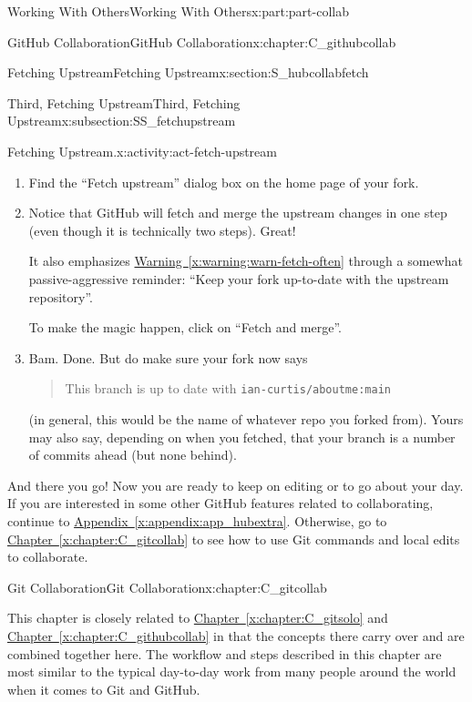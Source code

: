 \documentclass[oneside,10pt,]{book}
\newcommand{\xreffont}{\relax}
\newcommand{\mono}[1]{\texttt{#1}}
\begin{document}
\begin{partptx}{Working With Others}{}{Working With Others}{}{}{x:part:part-collab}
\begin{chapterptx}{GitHub Collaboration}{}{GitHub Collaboration}{}{}{x:chapter:C_githubcollab}
\begin{sectionptx}{Fetching Upstream}{}{Fetching Upstream}{}{}{x:section:S_hubcollabfetch}
\begin{subsectionptx}{Third, Fetching Upstream}{}{Third, Fetching Upstream}{}{}{x:subsection:SS_fetchupstream}
\begin{activity}{Fetching Upstream.}{x:activity:act-fetch-upstream}
\begin{enumerate}[font=\bfseries,label=(\alph*),ref=\alph*]
\item{}Find the ``Fetch upstream'' dialog box on the home page of your fork.%
\item{}Notice that GitHub will fetch and merge the upstream changes in one step (even though it is technically two steps). Great!%
\par
It also emphasizes \hyperref[x:warning:warn-fetch-often]{Warning~{\xreffont\ref{x:warning:warn-fetch-often}}} through a somewhat passive-aggressive reminder: ``Keep your fork up-to-date with the upstream repository''.%
\par
To make the magic happen, click on ``Fetch and merge''.%
\item{}Bam. Done. But do make sure your fork now says \begin{quote}%
This branch is up to date with \mono{ian-curtis/aboutme:main}\end{quote}
 (in general, this would be the name of whatever repo you forked from). Yours may also say, depending on when you fetched, that your branch is a number of commits ahead (but none behind).%
\end{enumerate}
\end{activity}%
\end{subsectionptx}
\begin{conclusion}{}%
And there you go! Now you are ready to keep on editing or to go about your day. If you are interested in some other GitHub features related to collaborating, continue to \hyperref[x:appendix:app_hubextra]{Appendix~{\xreffont\ref{x:appendix:app_hubextra}}}. Otherwise, go to \hyperref[x:chapter:C_gitcollab]{Chapter~{\xreffont\ref{x:chapter:C_gitcollab}}} to see how to use Git commands and local edits to collaborate.%
\end{conclusion}%
\end{sectionptx}
\end{chapterptx}
%
\typeout{************************************************}
\typeout{************************************************}
%
\begin{chapterptx}{Git Collaboration}{}{Git Collaboration}{}{}{x:chapter:C_gitcollab}
\begin{introduction}{}%
This chapter is closely related to \hyperref[x:chapter:C_gitsolo]{Chapter~{\xreffont\ref{x:chapter:C_gitsolo}}} and \hyperref[x:chapter:C_githubcollab]{Chapter~{\xreffont\ref{x:chapter:C_githubcollab}}} in that the concepts there carry over and are combined together here. The workflow and steps described in this chapter are most similar to the typical day-to-day work from many people around the world when it comes to Git and GitHub.%

\end{introduction}
\end{chapterptx}
\end{partptx}
\end{document}
